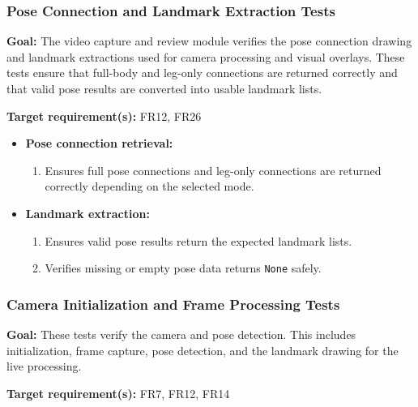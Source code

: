 \documentclass[12pt, titlepage]{article}
\begin{document}
\subsubsection{Pose Connection and Landmark Extraction Tests}

\textbf{Goal:} The video capture and review module verifies the pose connection drawing and landmark extractions used for camera processing and visual overlays. These tests ensure that full-body and leg-only connections are returned correctly and that valid pose results are converted into usable landmark lists.

\textbf{Target requirement(s):} FR12, FR26

\begin{itemize}
    \item \textbf{Pose connection retrieval:}
    \begin{enumerate}
        \item Ensures full pose connections and leg-only connections are returned correctly depending on the selected mode.
    \end{enumerate}

    \item \textbf{Landmark extraction:}
    \begin{enumerate}
        \item Ensures valid pose results return the expected landmark lists.
        \item Verifies missing or empty pose data returns \texttt{None} safely.
    \end{enumerate}
\end{itemize}

\subsubsection{Camera Initialization and Frame Processing Tests}

\textbf{Goal:} These tests verify the camera and pose detection. This includes initialization, frame capture, pose detection, and the landmark drawing for the live processing.

\textbf{Target requirement(s):} FR7, FR12, FR14
\end{document}
